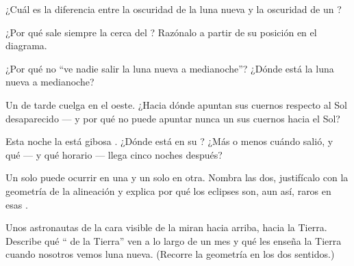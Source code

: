 \begin{exercise}[$\star$]\label{exo:g7:moon-phases:5}
¿Cuál es la diferencia entre la oscuridad de la luna nueva y la
oscuridad de un ?
\end{exercise}

\begin{exercise}[$\star$]\label{exo:g7:moon-phases:6}
¿Por qué sale siempre la  cerca del ? Razónalo
a partir de su posición en el diagrama.
\end{exercise}

\begin{exercise}[$\star$]\label{exo:g7:moon-phases:7}
¿Por qué no ``ve nadie salir la luna nueva a medianoche''? ¿Dónde está
la luna nueva a medianoche?
\end{exercise}

\begin{exercise}[$\star$]\label{exo:g7:moon-phases:8}
Un  de tarde cuelga en el oeste. ¿Hacia dónde apuntan sus
cuernos respecto al Sol desaparecido --- y por qué no puede apuntar
nunca un  sus cuernos hacia el Sol?
\end{exercise}

\begin{exercise}[$\star\star$]\label{exo:g7:moon-phases:9}
Esta noche la  está gibosa . ¿Dónde está en su
? ¿Más o menos cuándo salió, y qué  --- y qué
horario --- llega cinco noches después?
\end{exercise}

\begin{exercise}[$\star\star$]\label{exo:g7:moon-phases:10}
Un  solo puede ocurrir en una  y un
 solo en otra. Nombra las dos, justifícalo con la
geometría de la alineación y explica por qué los eclipses son, aun
así, raros en esas .
\end{exercise}

\begin{exercise}[$\star\star$]\label{exo:g7:moon-phases:11}
Unos astronautas de la cara visible de la  miran hacia arriba,
hacia la Tierra. Describe qué `` de la Tierra'' ven a lo largo
de un mes y qué  les enseña la Tierra cuando nosotros vemos
luna nueva. (Recorre la geometría en los dos sentidos.)
\end{exercise}

